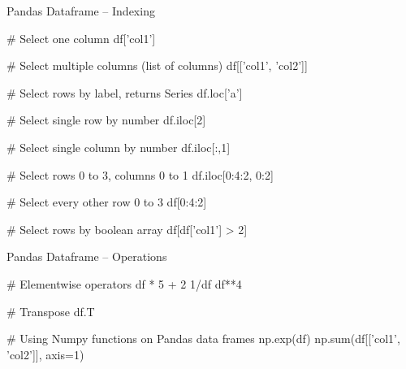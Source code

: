 \documentclass[ignorenonframetext,xcolor=x11names]{beamer}
\begin{document}

\begin{frame}[fragile]{Pandas Dataframe -- Indexing}
\begin{pythoncode}
# Select one column
df['col1']

# Select multiple columns (list of columns)
df[['col1', 'col2']]

# Select rows by label, returns Series
df.loc['a']

# Select single row by number
df.iloc[2]

# Select single column by number
df.iloc[:,1]

# Select rows 0 to 3, columns 0 to 1
df.iloc[0:4:2, 0:2] 

# Select every other row 0 to 3
df[0:4:2]

# Select rows by boolean array
df[df['col1'] > 2]
\end{pythoncode}

\end{frame}

\begin{frame}[fragile]{Pandas Dataframe -- Operations}


\begin{pythoncode}
# Elementwise operators
df * 5 + 2
1/df
df**4

# Transpose
df.T

# Using Numpy functions on Pandas data frames
np.exp(df)
np.sum(df[['col1', 'col2']], axis=1)
\end{pythoncode}
\end{frame}
\end{document}
